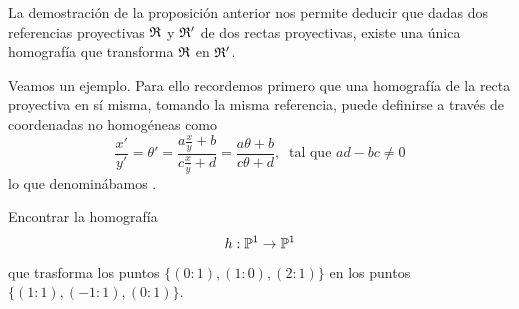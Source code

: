\begin{obs}
	La demostración de la proposición anterior nos permite deducir que dadas dos referencias proyectivas $\mathfrak{R}$ y $\mathfrak{R'}$ de dos rectas proyectivas, existe una única homografía que transforma $\mathfrak{R}$ en $\mathfrak{R'}$.
\end{obs}
Veamos un ejemplo. Para ello recordemos primero que una homografía de la recta proyectiva en sí misma, tomando la misma referencia,  puede definirse a través de coordenadas no homogéneas como
\begin{equation}
	\label{C5_eq_homografia_nohom}
	\frac{x'}{y'}=\theta'=\frac{a\frac{x}{y}+b}{c\frac{x}{y}+d}=\frac{a\theta+b}{c\theta +d}, \ \text{ tal que } ad-bc\not=0
\end{equation}
lo que denominábamos .
\begin{exa}
	Encontrar la homografía 
	\[h:\mathbb{P}^1\rightarrow \mathbb{P}^1\] 
	que trasforma los puntos $\{(0:1),(1:0),(2:1)\}$ en los puntos $\{(1:1),(-1:1),(0:1)\}$.\\
	

\end{exa}
